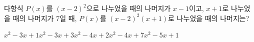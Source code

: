 다항식 $P(x)$를 $(x-2)^2$으로 나누었을 때의 나머지가 $x-1$이고, $x+1$로 나누었을 때의 나머지가 $7$일 때, $P(x)$를 $(x-2)^2(x+1)$로 나누었을 때의 나머지는?
\begin{choicesii}{$x^2-3x+1$}{$x^2-3x+3$}{$x^2-4x+2$}{$x^2-4x+7$}{$x^2-5x+1$}\end{choicesii}
